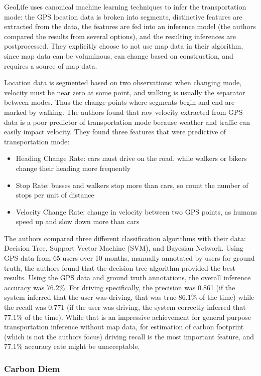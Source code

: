 GeoLife uses canonical machine learning techniques to infer the transportation mode: the GPS location data is broken into segments, distinctive features are extracted from the data, the features are fed into an inference model (the authors compared the results from several options), and the resulting inferences are postprocessed. They explicitly choose to not use map data in their algorithm, since map data can be voluminous, can change based on construction, and requires a source of map data.

Location data is segmented based on two observations: when changing mode, velocity must be near zero at some point, and walking is usually the separator between modes. Thus the change points where segments begin and end are marked by walking. The authors found that raw velocity extracted from GPS data is a poor predictor of transportation mode because weather and traffic can easily impact velocity. They found three features that were predictive of transportation mode:
\begin{itemize}
	\item Heading Change Rate: cars must drive on the road, while walkers or bikers change their heading more frequently
	\item Stop Rate: busses and walkers stop more than cars, so count the number of stops per unit of distance
	\item Velocity Change Rate: change in velocity between two GPS points, as humans speed up and slow down more than cars
\end{itemize}

The authors compared three different classification algorithms with their data: 
Decision Tree, Support Vector Machine (SVM), and Bayesian Network. Using GPS data from 65 users over 10 months, manually annotated by users for ground truth, the authors found that the decision tree algorithm provided the best results. Using the GPS data and ground truth annotations, the overall inference accuracy was 76.2\%. For driving specifically, the precision was 0.861 (if the system inferred that the user was driving, that was true 86.1\% of the time) while the recall was 0.771 (if the user was driving, the system correctly inferred that 77.1\% of the time). While that is an impressive achievement for general purpose transportation inference without map data, for estimation of carbon footprint (which is not the authors focus) driving recall is the most important feature, and 77.1\% accuracy rate might be unacceptable.

\subsubsection{Carbon Diem}

